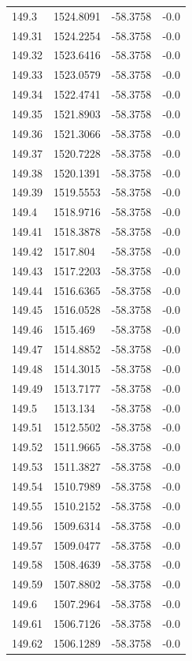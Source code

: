 \begin{table}[H]
\begin{tabular}{llll}
149.3 & 1524.8091 & -58.3758 & -0.0 \\
149.31 & 1524.2254 & -58.3758 & -0.0 \\
149.32 & 1523.6416 & -58.3758 & -0.0 \\
149.33 & 1523.0579 & -58.3758 & -0.0 \\
149.34 & 1522.4741 & -58.3758 & -0.0 \\
149.35 & 1521.8903 & -58.3758 & -0.0 \\
149.36 & 1521.3066 & -58.3758 & -0.0 \\
149.37 & 1520.7228 & -58.3758 & -0.0 \\
149.38 & 1520.1391 & -58.3758 & -0.0 \\
149.39 & 1519.5553 & -58.3758 & -0.0 \\
149.4 & 1518.9716 & -58.3758 & -0.0 \\
149.41 & 1518.3878 & -58.3758 & -0.0 \\
149.42 & 1517.804 & -58.3758 & -0.0 \\
149.43 & 1517.2203 & -58.3758 & -0.0 \\
149.44 & 1516.6365 & -58.3758 & -0.0 \\
149.45 & 1516.0528 & -58.3758 & -0.0 \\
149.46 & 1515.469 & -58.3758 & -0.0 \\
149.47 & 1514.8852 & -58.3758 & -0.0 \\
149.48 & 1514.3015 & -58.3758 & -0.0 \\
149.49 & 1513.7177 & -58.3758 & -0.0 \\
149.5 & 1513.134 & -58.3758 & -0.0 \\
149.51 & 1512.5502 & -58.3758 & -0.0 \\
149.52 & 1511.9665 & -58.3758 & -0.0 \\
149.53 & 1511.3827 & -58.3758 & -0.0 \\
149.54 & 1510.7989 & -58.3758 & -0.0 \\
149.55 & 1510.2152 & -58.3758 & -0.0 \\
149.56 & 1509.6314 & -58.3758 & -0.0 \\
149.57 & 1509.0477 & -58.3758 & -0.0 \\
149.58 & 1508.4639 & -58.3758 & -0.0 \\
149.59 & 1507.8802 & -58.3758 & -0.0 \\
149.6 & 1507.2964 & -58.3758 & -0.0 \\
149.61 & 1506.7126 & -58.3758 & -0.0 \\
149.62 & 1506.1289 & -58.3758 & -0.0 \\

\end{tabular}
\end{table}
